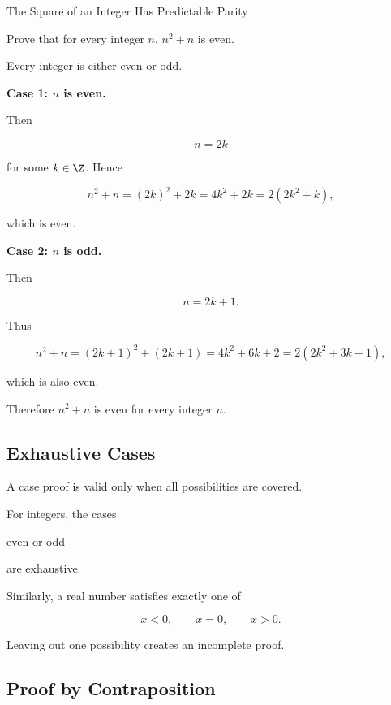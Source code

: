 \begin{workedexamplebox}{The Square of an Integer Has Predictable Parity}

Prove that for every integer \(n\), \(n^2+n\) is even.

Every integer is either even or odd.

\textbf{Case 1: \(n\) is even.}

Then

\[ n=2k \]

for some \(k\in\Z\). Hence

\[ n^2+n=(2k)^2+2k=4k^2+2k=2(2k^2+k), \]

which is even.

\textbf{Case 2: \(n\) is odd.}

Then

\[ n=2k+1. \]

Thus

\[ n^2+n=(2k+1)^2+(2k+1)=4k^2+6k+2=2(2k^2+3k+1), \]

which is also even.

\begin{answerbox}
Therefore \(n^2+n\) is even for every integer \(n\).
\end{answerbox}
\end{workedexamplebox}

\subsection{Exhaustive Cases}
\label{subsec:exhaustive-cases}

A case proof is valid only when all possibilities are covered.

For integers, the cases

\begin{center}
even or odd
\end{center}

are exhaustive.

Similarly, a real number satisfies exactly one of

\[ x<0,\qquad x=0,\qquad x>0. \]

Leaving out one possibility creates an incomplete proof.

\subsection{Proof by Contraposition}
\label{subsec:proof-contraposition}


